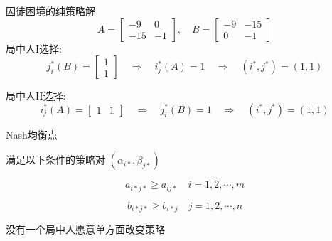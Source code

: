 \documentclass[12pt, a4paper, oneside, UTF8]{ctexbook}
\begin{document}
囚徒困境的纯策略解
$$
A = \begin{bmatrix} -9 & 0 \\ -15 & -1 \end{bmatrix}, \quad
B = \begin{bmatrix} -9 & -15 \\ 0 & -1 \end{bmatrix}
$$
局中人I选择:
$$ j_i^* (B) = \begin{bmatrix} 1 \\ 1 \end{bmatrix} \quad \Rightarrow \quad i_j^* (A) = 1 \quad \Rightarrow \quad (i^*, j^*) = (1, 1) $$

局中人II选择:
$$ i_j^* (A) = \begin{bmatrix} 1 & 1 \end{bmatrix} \quad \Rightarrow \quad j_i^* (B) = 1 \quad \Rightarrow \quad (i^*, j^*) = (1, 1) $$

\begin{definition}
    Nash均衡点

满足以下条件的策略对 \((\alpha_{i*}, \beta_{j*})\)

\[ a_{i*j*} \geq a_{ij*} \quad i = 1, 2, \cdots, m \]

\[ b_{i*j*} \geq b_{i*j} \quad j = 1, 2, \cdots, n \]

没有一个局中人愿意单方面改变策略
\end{definition}

\ifx\allfiles\undefined
\end{document}
